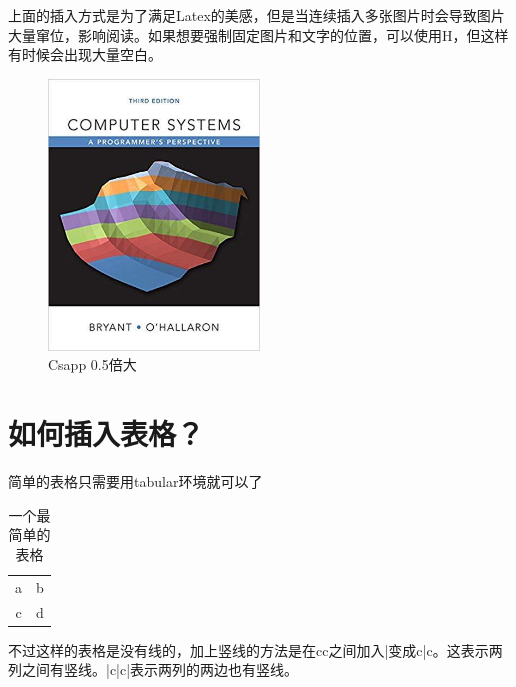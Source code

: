 \documentclass[twoside]{ctexart}
\begin{document}
    上面的插入方式是为了满足Latex的美感，但是当连续插入多张图片时会导致图片大量窜位，影响阅读。如果想要强制固定图片和文字的位置，可以使用H，但这样有时候会出现大量空白。
    \begin{figure}[H]
        \centering
        \includegraphics[width = 0.5\textwidth]{figure/csapp.jpg}
        \caption{Csapp 0.5倍大}
        \label{fig:my_label}
    \end{figure}
    
    \section{如何插入表格？}
    
    简单的表格只需要用tabular环境就可以了
    \begin{table}[H] %
        \centering %
        \begin{tabular}{cc} 
        
        
        a & b \\ %
        c & d
        
        \end{tabular}
        \caption{一个最简单的表格}
        \label{tab:my_label}
    \end{table}
    
    不过这样的表格是没有线的，加上竖线的方法是在cc之间加入|变成c|c。这表示两列之间有竖线。|c|c|表示两列的两边也有竖线。
    
\end{document}
